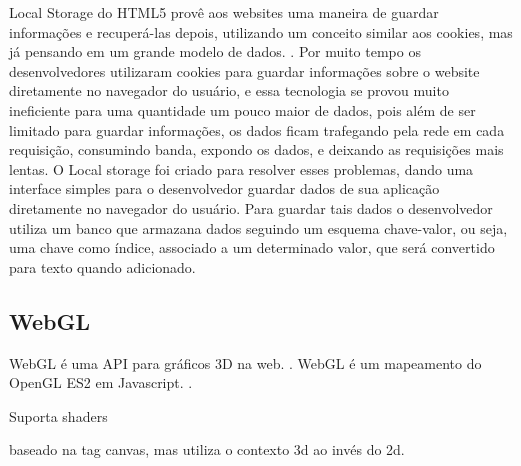 Local Storage do HTML5 provê aos websites uma maneira de guardar
informações e recuperá-las depois, utilizando um conceito similar aos
cookies, mas já pensando em um grande modelo de dados. \cite{pilgrim2010html5}.
Por muito tempo os desenvolvedores utilizaram cookies para guardar
informações sobre o website diretamente no navegador do usuário, e
essa tecnologia se provou muito ineficiente para uma quantidade um
pouco maior de dados, pois além de ser limitado para guardar informações,
os dados ficam trafegando pela rede em cada requisição, consumindo
banda, expondo os dados, e deixando as requisições mais lentas.
O Local storage foi criado para resolver esses problemas, dando uma
interface simples para o desenvolvedor guardar dados de sua
aplicação diretamente no navegador do usuário. Para guardar tais dados
o desenvolvedor utiliza um banco que armazana dados seguindo um
esquema chave-valor, ou seja, uma chave como índice, associado a um
determinado valor, que será convertido para texto quando adicionado.


\subsection{WebGL}

WebGL é uma API para gráficos 3D na web. \cite{lubbers2010pro}.
WebGL é um mapeamento do OpenGL ES2 em Javascript. \cite{lubbers2010pro}.


Suporta shaders

baseado na tag canvas, mas utiliza o contexto 3d ao invés do 2d.
